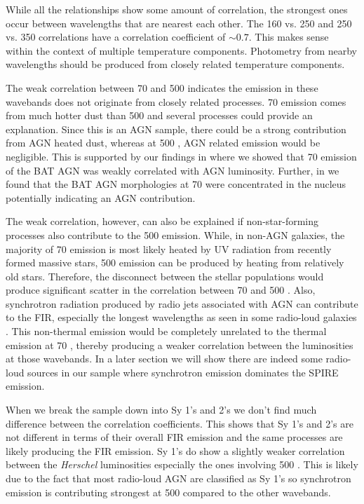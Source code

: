 While all the relationships show some amount of correlation, the strongest ones occur between wavelengths that are nearest each other. The 160 vs. 250 \um{} and 250 vs. 350 \um{} correlations have a correlation coefficient of $\sim0.7$. This makes sense within the context of multiple temperature components. Photometry from nearby wavelengths should be produced from closely related temperature components.

The weak correlation between 70 and 500 \um{} indicates the emission in these wavebands does not originate from closely related processes. 70 \um{} emission comes from much hotter dust than 500 \um{} and several processes could provide an explanation. Since this is an AGN sample, there could be a strong contribution from AGN heated dust, whereas at 500 \um{}, AGN related emission would be negligible. This is supported by our findings in \citet{Melendez:2014yu} where we showed that 70 \um{} emission of the BAT AGN was weakly correlated with AGN luminosity. Further, in \citet{Mushotzky:2014ad} we found that the BAT AGN morphologies at 70 \um{} were concentrated in the nucleus potentially indicating an AGN contribution.

The weak correlation, however, can also be explained if non-star-forming processes also contribute to the 500 \um{} emission. While, in non-AGN galaxies, the majority of 70 \um{} emission is most likely heated by UV radiation from recently formed massive stars, 500 \um{} emission can be produced by heating from relatively old stars. Therefore, the disconnect between the stellar populations would produce significant scatter in the correlation between 70 and 500 \um. Also, synchrotron radiation produced by radio jets associated with AGN can contribute to the FIR, especially the longest wavelengths as seen in some radio-loud galaxies \citep{Baes:2010ek,Boselli:2010fr}. This non-thermal emission would be completely unrelated to the thermal emission at 70 \um, thereby producing a weaker correlation between the luminosities at those wavebands. In a later section we will show there are indeed some radio-loud sources in our sample where synchrotron emission dominates the SPIRE emission. 

When we break the sample down into Sy 1's and 2's we don't find much difference between the correlation coefficients. This shows that Sy 1's and 2's are not different in terms of their overall FIR emission and the same processes are likely producing the FIR emission. Sy 1's do show a slightly weaker correlation between the \textit{Herschel} luminosities especially the ones involving 500 \um. This is likely due to the fact that most radio-loud AGN are classified as Sy 1's so synchrotron emission is contributing strongest at 500 \um{} compared to the other wavebands.
  